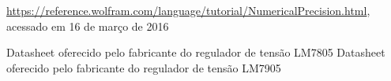\documentclass[12pt,a4paper]{instrumentacao}
\begin{document}
\begin{thebibliography}{9}
 \url{https://reference.wolfram.com/language/tutorial/NumericalPrecision.html}, acessado em 16 de março de 2016


 Datasheet oferecido pelo fabricante do regulador de tensão LM7805
 Datasheet oferecido pelo fabricante do regulador de tensão LM7905


\end{thebibliography}
\end{document}

